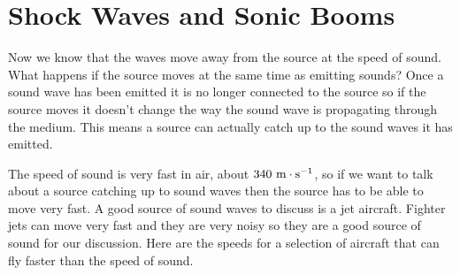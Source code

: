 
%

\section{Shock Waves and Sonic Booms}

Now we know that the waves move away from the source at the speed of sound. What happens if the source moves at the same time as emitting sounds? Once a sound wave has been emitted it is no longer connected to the source so if the source moves it doesn't change the way the sound wave is propagating through the medium. This means a source can actually catch up to the sound waves it has emitted. 

The speed of sound is very fast in air, about $340\ \rm{m\cdot s}^{-1}$, so if we want to talk about a source catching up to sound waves then the source has to be able to move very fast. A good source of sound waves to discuss is a jet aircraft. Fighter jets can move very fast and they are very noisy so they are a good source of sound for our discussion. Here are the speeds for a selection of aircraft that can fly faster than the speed of sound.

